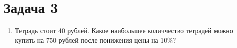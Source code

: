 \chapter{Задача 3}	
\begin{enumerate}
		
	\item Тетрадь стоит 40 рублей. Какое наибольшее количчество тетрадей можно купить на 750 рублей после понижения цены на 10\%?
	
\end{enumerate}
